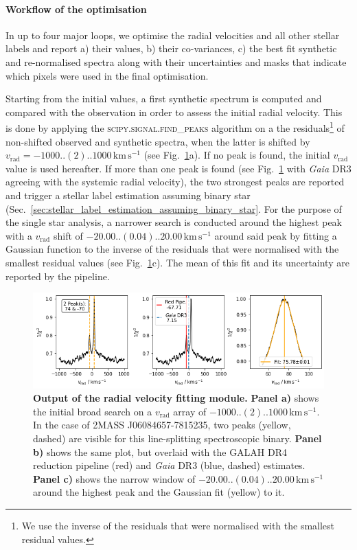 \documentclass[
  journal=pasa,
  manuscript=research-paper, %
  year=2021,
  volume=37
]{cup-journal}
\newcommand{\vrad}{$v_\mathrm{rad}$\xspace}
\newcommand{\Gaia}{\textit{Gaia}\xspace}
\newcommand{\kms}{\,\mathrm{km\,s^{-1}}}	%
\begin{document}
\paragraph{Workflow of the optimisation}

In up to four major loops, we optimise the radial velocities and all other stellar labels and report a) their values, b) their co-variances, c) the best fit synthetic and re-normalised spectra along with their uncertainties and masks that indicate which pixels were used in the final optimisation.

Starting from the initial values, a first synthetic spectrum is computed and compared with the observation in order to assess the initial radial velocity. This is done by applying the \textsc{scipy.signal.find\_peaks} algorithm on a the residuals\footnote{We use the inverse of the residuals that were normalised with the smallest residual values.} of non-shifted observed and synthetic spectra, when the latter is shifted by $v_\text{rad} = -1000..(2)..1000\kms$ (see Fig.~\ref{fig:181221003101356_single_fit_rv}a). If no peak is found, the initial \vrad value is used hereafter. If more than one peak is found (see Fig.~\ref{fig:181221003101356_single_fit_rv} with \Gaia DR3 agreeing with the systemic radial velocity), the two strongest peaks are reported and trigger a stellar label estimation assuming binary star (Sec.~\ref{sec:stellar_label_estimation_assuming_binary_star}. For the purpose of the single star analysis, a narrower search is conducted around the highest peak with a \vrad shift of $-20.00..(0.04)..20.00\kms$ around said peak by fitting a Gaussian function to the inverse of the residuals that were normalised with the smallest residual values (see Fig.~\ref{fig:181221003101356_single_fit_rv}c). The mean of this fit and its uncertainty are reported by the pipeline.

\begin{figure}[hbt!]
 \centering
 \includegraphics[width=\textwidth]{figures/181221003101356_single_fit_rv.png}
 \caption{\textbf{Output of the radial velocity fitting module.} \textbf{Panel a)} shows the initial broad search on a \vrad array of $-1000..(2)..1000\kms$. In the case of 2MASS J06084657-7815235, two peaks (yellow, dashed) are visible for this line-splitting spectroscopic binary. \textbf{Panel b)} shows the same plot, but overlaid with the GALAH DR4 reduction pipeline (red) and \Gaia DR3 (blue, dashed) estimates. \textbf{Panel c)} shows the narrow window of $-20.00..(0.04)..20.00\kms$ around the highest peak and the Gaussian fit (yellow) to it.}
 \label{fig:181221003101356_single_fit_rv}
\end{figure}
\end{document}
